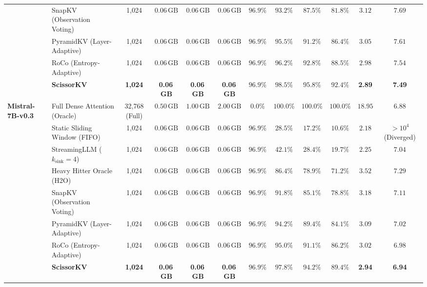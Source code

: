 \begin{table}[t]
{\begin{tabular}{ll c ccc c ccc c c}
 & SnapKV (Observation Voting)   & 1,024         & $0.06\,\text{GB}$ & $0.06\,\text{GB}$ & $0.06\,\text{GB}$ & $\mathbf{96.9\%}$ & $93.2\%$ & $87.5\%$ & $81.8\%$ & $3.12$ & $7.69$ \\
 & PyramidKV (Layer-Adaptive)     & 1,024         & $0.06\,\text{GB}$ & $0.06\,\text{GB}$ & $0.06\,\text{GB}$ & $\mathbf{96.9\%}$ & $95.5\%$ & $91.2\%$ & $86.4\%$ & $3.05$ & $7.61$ \\
 & RoCo (Entropy-Adaptive)        & 1,024         & $0.06\,\text{GB}$ & $0.06\,\text{GB}$ & $0.06\,\text{GB}$ & $\mathbf{96.9\%}$ & $96.2\%$ & $92.8\%$ & $88.5\%$ & $2.98$ & $7.54$ \\
 & \textbf{\neuralops{} ScissorKV} & \textbf{1,024} & \textbf{0.06\,GB} & \textbf{0.06\,GB} & \textbf{0.06\,GB} & $\mathbf{96.9\%}$ & $\mathbf{98.5\%}$ & $\mathbf{95.8\%}$ & $\mathbf{92.4\%}$ & \textbf{2.89} & \textbf{7.49} \\
\midrule
\multirow{8}{*}{\textbf{Mistral-7B-v0.3}}
 & Full Dense Attention (Oracle) & 32,768 (Full) & $0.50\,\text{GB}$ & $1.00\,\text{GB}$ & $2.00\,\text{GB}$ & $0.0\%$ & $100.0\%$ & $100.0\%$ & $100.0\%$ & $18.95$ & $6.88$ \\
 & Static Sliding Window (FIFO)   & 1,024         & $0.06\,\text{GB}$ & $0.06\,\text{GB}$ & $0.06\,\text{GB}$ & $\mathbf{96.9\%}$ & $28.5\%$ & $17.2\%$ & $10.6\%$ & $\mathbf{2.18}$ & $>10^4$ (Diverged) \\
 & StreamingLLM ($k_{\text{sink}}{=}4$) & 1,024   & $0.06\,\text{GB}$ & $0.06\,\text{GB}$ & $0.06\,\text{GB}$ & $\mathbf{96.9\%}$ & $42.1\%$ & $28.4\%$ & $19.7\%$ & $2.25$ & $7.04$ \\
 & Heavy Hitter Oracle (\textsc{H2O}) & 1,024      & $0.06\,\text{GB}$ & $0.06\,\text{GB}$ & $0.06\,\text{GB}$ & $\mathbf{96.9\%}$ & $86.4\%$ & $78.9\%$ & $71.2\%$ & $3.52$ & $7.29$ \\
 & SnapKV (Observation Voting)   & 1,024         & $0.06\,\text{GB}$ & $0.06\,\text{GB}$ & $0.06\,\text{GB}$ & $\mathbf{96.9\%}$ & $91.8\%$ & $85.1\%$ & $78.8\%$ & $3.18$ & $7.11$ \\
 & PyramidKV (Layer-Adaptive)     & 1,024         & $0.06\,\text{GB}$ & $0.06\,\text{GB}$ & $0.06\,\text{GB}$ & $\mathbf{96.9\%}$ & $94.2\%$ & $89.4\%$ & $84.1\%$ & $3.09$ & $7.02$ \\
 & RoCo (Entropy-Adaptive)        & 1,024         & $0.06\,\text{GB}$ & $0.06\,\text{GB}$ & $0.06\,\text{GB}$ & $\mathbf{96.9\%}$ & $95.0\%$ & $91.1\%$ & $86.2\%$ & $3.02$ & $6.98$ \\
 & \textbf{\neuralops{} ScissorKV} & \textbf{1,024} & \textbf{0.06\,GB} & \textbf{0.06\,GB} & \textbf{0.06\,GB} & $\mathbf{96.9\%}$ & $\mathbf{97.8\%}$ & $\mathbf{94.2\%}$ & $\mathbf{89.4\%}$ & \textbf{2.94} & \textbf{6.94} \\
\bottomrule
\end{tabular}%
}
\end{table}

